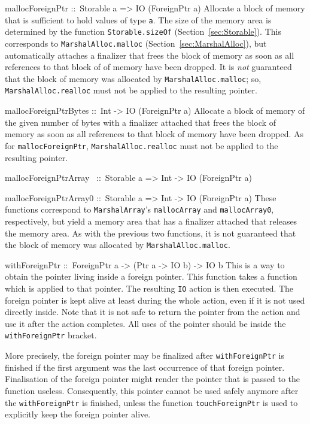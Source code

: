 \documentclass[a4paper,twoside]{article}
\makeatletter
\newcommand{\code}[1]{\texttt{#1}}      %
\newenvironment{codedesc}{%
  \list{}{\labelwidth\z@
    \let\makelabel\codedesclabel}
  }{%
  \endlist
  }
\newcommand*{\codedesclabel}[1]{%
  \hspace{-\leftmargin}
  \parbox[b]{\labelwidth}{\makebox[0pt][l]{\code{#1}}\\}\hfil\relax
  }
\newcommand{\combineitems}{\vspace*{-\itemsep}\vspace*{-\parsep}\vspace*{-1em}}
\makeatother
\begin{document}
\begin{codedesc}
\item[mallocForeignPtr ::\ Storable a => IO (ForeignPtr a)] Allocate a block
  of memory that is sufficient to hold values of type \code{a}.  The size of
  the memory area is determined by the function \code{Storable.sizeOf}
  (Section~\ref{sec:Storable}).  This corresponds to
  \code{MarshalAlloc.malloc} (Section~\ref{sec:MarshalAlloc}), but
  automatically attaches a finalizer that frees the block of memory as soon as
  all references to that block of of memory have been dropped.  It is
  \emph{not} guaranteed that the block of memory was allocated by
  \code{MarshalAlloc.malloc}; so, \code{MarshalAlloc.realloc} must not be
  applied to the resulting pointer.

\item[mallocForeignPtrBytes ::\ Int -> IO (ForeignPtr a)] Allocate a block of
  memory of the given number of bytes with a finalizer attached that frees the
  block of memory as soon as all references to that block of memory have
  been dropped.  As for \code{mallocForeignPtr}, \code{MarshalAlloc.realloc}
  must not be applied to the resulting pointer.

\item[mallocForeignPtrArray~ ::\ Storable a => Int -> IO (ForeignPtr a)]
\item[mallocForeignPtrArray0 ::\ Storable a => Int -> IO (ForeignPtr a)]%
  \combineitems These functions correspond to \code{MarshalArray}'s
  \code{mallocArray} and \code{mallocArray0}, respectively, but yield a memory
  area that has a finalizer attached that releases the memory area.  As with
  the previous two functions, it is not guaranteed that the block of memory
  was allocated by \code{MarshalAlloc.malloc}.
  
\item[withForeignPtr ::\ ForeignPtr a -> (Ptr a -> IO b) -> IO b]
  This is a way to obtain the pointer living inside a foreign pointer. This
  function takes a function which is applied to that pointer. The resulting
  \code{IO} action is then executed. The foreign pointer is kept alive at least
  during the whole action, even if it is not used directly inside. Note that
  it is not safe to return the pointer from the action and use it after the
  action completes.  All uses of the pointer should be inside the
  \code{withForeignPtr} bracket.

  More precisely, the foreign pointer may be finalized after
  \code{withForeignPtr} is finished if the first argument was the last
  occurrence of that foreign pointer.  Finalisation of the foreign pointer
  might render the pointer that is passed to the function useless.
  Consequently, this pointer cannot be used safely anymore after the
  \code{withForeignPtr} is finished, unless the function
  \code{touchForeignPtr} is used to explicitly keep the foreign pointer alive.
  

\end{codedesc}
\end{document}
